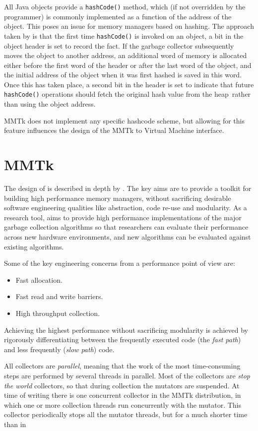 All Java objects provide a \lstinline|hashCode()| method, which (if not overridden 
by the programmer) is commonly implemented as a function of the address of the 
object.  This poses an issue for memory managers based on hashing.  The approach 
taken by \jikes is that the first time \lstinline|hashCode()| is invoked on an object,
a bit in the object header is set to record the fact.  If the garbage collector
subsequently moves the object to another address, an additional word of memory is allocated
either before the first word of the header or after the last word of the object,
and the initial address of the object when it was first hashed is saved in this
word.  Once this has taken place, a second bit in the header is set to indicate that
future \lstinline|hashCode()| operations should fetch the original hash value from the heap\
rather than using the object address.

MMTk does not implement any specific hashcode scheme, but allowing for this feature
influences the design of the MMTk to Virtual Machine interface.

\section{MMTk}

The design of \mmtk is described in depth by \citet{BCM:04, BCM:04b}.
The key aims are to provide a toolkit for building high performance 
memory managers, without sacrificing desirable software engineering
qualities like abstraction, code re-use and modularity.  As a research tool, \mmtk aims
to provide high performance implementations of the major garbage collection algorithms
so that researchers can evaluate their performance across new hardware environments,
and new algorithms can be evaluated against existing algorithms.

Some of the key engineering concerns from a performance point of view are:
\begin{itemize}
  \item Fast allocation.  
  \item Fast read and write barriers.
  \item High throughput collection.
\end{itemize}
Achieving the highest performance without sacrificing modularity is achieved by rigorously
differentiating between the frequently executed code (the \emph{fast path}) and less frequently
(\emph{slow path}) code.

All \mmtk collectors are \emph{parallel}, meaning that the work of the most time-consuming 
steps are performed by several threads in parallel.  Most of the \mmtk collectors are 
\emph{stop the world} collectors, so that during collection the mutators are suspended.  At time
of writing there is one concurrent collector in the MMTk distribution, in which one or more
collection threads run concurrently with the mutator.  This collector periodically stops all the
mutator threads, but for a much shorter time than in 

